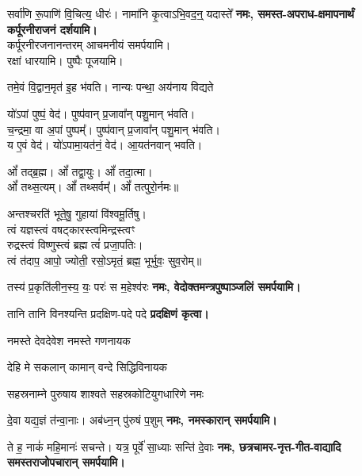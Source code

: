 \begin{center}
{सर्वा॑णि रू॒पाणि॑ वि॒चित्य॒ धीरः॑। नामा॑नि कृ॒त्वाऽभि॒वद॒न्॒ यदास्ते᳚}
\textbf{\devAya{} नमः, समस्त-अपराध-क्षमापनार्थं कर्पूरनीराजनं दर्शयामि।\\}
कर्पूरनीरजनानन्तरम् आचमनीयं समर्पयामि।\\
रक्षां धारयामि। पुष्पैः पूजयामि।
\medskip

{तमे॒वं वि॒द्वान॒मृत॑ इ॒ह भ॑वति। नान्यः पन्था॒ अय॑नाय विद्यते}

यो॑ऽपां पुष्पं॒ वेद॑। पुष्प॑वान् प्र॒जावा᳚न् पशु॒मान् भ॑वति।\\
च॒न्द्रमा॒ वा अ॒पां पुष्पम्᳚। पुष्प॑वान् प्र॒जावा᳚न् पशु॒मान् भ॑वति।\\
य ए॒वं वेद॑। यो॑ऽपामा॒यत॑नं॒ वेद॑। आ॒यत॑नवान् भवति।\medskip

ओं᳚ तद्ब्र॒ह्म। ओं᳚ तद्वा॒युः। ओं᳚ तदा॒त्मा।\\
ओं᳚ तथ्स॒त्यम्‌। ओं᳚ तथ्सर्वम्᳚‌। ओं᳚ तत्पुरो॒र्नमः॥\medskip

अन्तश्चरति॑ भूते॒षु॒ गुहायां वि॑श्वमू॒र्तिषु।\\
त्वं यज्ञस्त्वं वषट्कारस्त्वमिन्द्रस्त्वꣳ\\
रुद्रस्त्वं विष्णुस्त्वं ब्रह्म त्वं॑ प्रजा॒पतिः।\\
त्वं त॑दाप॒ आपो॒ ज्योती॒ रसो॒ऽमृतं॒ ब्रह्म॒ भूर्भुवः॒ सुव॒रोम्‌॥\medskip

{तस्य॑ प्र॒कृति॑लीन॒स्य॒ यः॒ परः॑ स म॒हेश्व॑रः}
\textbf{\devAya{} नमः, वेदोक्तमन्त्रपुष्पाञ्जलिं समर्पयामि।}
\medskip


{तानि तानि विनश्यन्ति प्रदक्षिण-पदे पदे}
\textbf{प्रदक्षिणं कृत्वा।}
\medskip

{नमस्ते देवदेवेश नमस्ते गणनायक} 

{देहि मे सकलान् कामान् वन्दे सिद्धिविनायक} 

{सहस्रनाम्ने पुरुषाय शाश्वते सहस्रकोटियुगधारिणे नमः}

{दे॒वा यद्य॒ज्ञं त॑न्वा॒नाः। अब॑ध्न॒न् पु॑रुषं प॒शुम्}
\textbf{\devAya{} नमः, नमस्कारान् समर्पयामि।}
\medskip

{ते ह॒ नाकं॑ महि॒मानः॑ सचन्ते। यत्र॒ पूर्वे॑ सा॒ध्याः सन्ति॑ दे॒वाः}
\textbf{\devAya{} नमः, छत्रचामर-नृत्त-गीत-वाद्यादि समस्तराजोपचारान् समर्पयामि।}
\medskip


\end{center}
